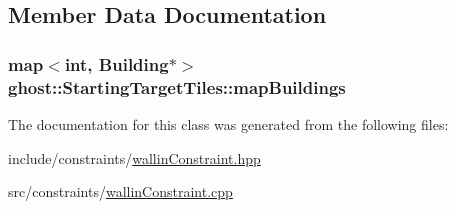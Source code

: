 \subsection{Member Data Documentation}
\hypertarget{classghost_1_1StartingTargetTiles_a08e51275da85bfaa8a108976cbd133e2}{
\subsubsection[{map\-Buildings}]{\setlength{\rightskip}{0pt plus 5cm}map$<$int, {\bf Building}$\ast$$>$ ghost\-::\-Starting\-Target\-Tiles\-::map\-Buildings\hspace{0.3cm}{\ttfamily [private]}}}\label{classghost_1_1StartingTargetTiles_a08e51275da85bfaa8a108976cbd133e2}


The documentation for this class was generated from the following files\-:\begin{DoxyCompactItemize}
\item 
include/constraints/\hyperlink{wallinConstraint_8hpp}{wallin\-Constraint.\-hpp}\item 
src/constraints/\hyperlink{wallinConstraint_8cpp}{wallin\-Constraint.\-cpp}\end{DoxyCompactItemize}
